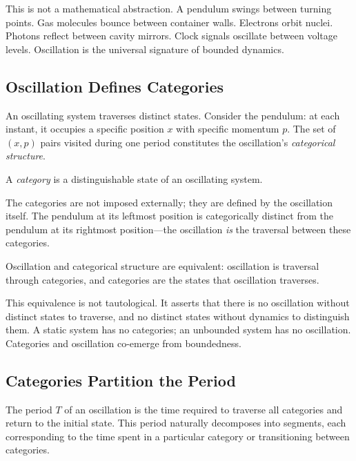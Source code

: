 This is not a mathematical abstraction. A pendulum swings between turning points. Gas molecules bounce between container walls. Electrons orbit nuclei. Photons reflect between cavity mirrors. Clock signals oscillate between voltage levels. Oscillation is the universal signature of bounded dynamics.

\subsection{Oscillation Defines Categories}

An oscillating system traverses distinct states. Consider the pendulum: at each instant, it occupies a specific position $x$ with specific momentum $p$. The set of $(x, p)$ pairs visited during one period constitutes the oscillation's \textit{categorical structure}.

\begin{definition}[Category]
A \textit{category} is a distinguishable state of an oscillating system.
\end{definition}

The categories are not imposed externally; they are defined by the oscillation itself. The pendulum at its leftmost position is categorically distinct from the pendulum at its rightmost position---the oscillation \textit{is} the traversal between these categories.

\begin{proposition}
\label{prop:oscillation_categories}
Oscillation and categorical structure are equivalent: oscillation is traversal through categories, and categories are the states that oscillation traverses.
\end{proposition}

This equivalence is not tautological. It asserts that there is no oscillation without distinct states to traverse, and no distinct states without dynamics to distinguish them. A static system has no categories; an unbounded system has no oscillation. Categories and oscillation co-emerge from boundedness.

\subsection{Categories Partition the Period}

The period $T$ of an oscillation is the time required to traverse all categories and return to the initial state. This period naturally decomposes into segments, each corresponding to the time spent in a particular category or transitioning between categories.

